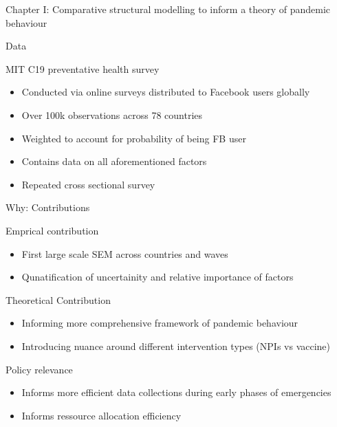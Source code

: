 \documentclass[
  ignorenonframetext,
]{beamer}
\providecommand{\tightlist}{%
  \setlength{\itemsep}{0pt}\setlength{\parskip}{0pt}}\usepackage{longtable,booktabs,array}
\begin{document}
\begin{frame}[fragile]{Chapter I: Comparative structural modelling to
inform a theory of pandemic behaviour}
\begin{block}{Data}
\label{data}
\begin{block}{MIT C19 preventative health survey}
\label{mit-c19-preventative-health-survey}
\begin{itemize}
\tightlist
\item
  Conducted via online surveys distributed to Facebook users globally
\item
  Over 100k observations across 78 countries
\item
  Weighted to account for probability of being FB user
\item
  Contains data on all aforementioned factors
\item
  Repeated cross sectional survey
\end{itemize}
\end{block}
\end{block}

\begin{block}{Why: Contributions}
\label{why-contributions}
\begin{block}{Emprical contribution}
\label{emprical-contribution}
\begin{itemize}
\tightlist
\item
  First large scale SEM across countries and waves
\item
  Qunatification of uncertainity and relative importance of factors
\end{itemize}
\end{block}

\begin{block}{Theoretical Contribution}
\label{theoretical-contribution}
\begin{itemize}
\tightlist
\item
  Informing more comprehensive framework of pandemic behaviour
\item
  Introducing nuance around different intervention types (NPIs vs
  vaccine)
\end{itemize}
\end{block}

\begin{block}{Policy relevance}
\label{policy-relevance}
\begin{itemize}
\tightlist
\item
  Informs more efficient data collections during early phases of
  emergencies
\item
  Informs ressource allocation efficiency
\end{itemize}
\end{block}
\end{block}
\end{frame}
\end{document}
